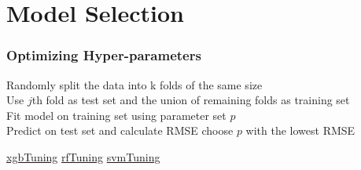 \documentclass{beamer}
\begin{document}
\section{Model Selection}



\begin{frame}[fragile]
\frametitle{Optimizing Hyper-parameters} 

\begin{algorithm}[H]
\scriptsize
\BlankLine
{}
    {
     Randomly split the data into k folds of the same size \\
    	{
    	Use $j$th fold as test set and the union of remaining folds as training set \\
        {
                Fit model on training set using parameter set $p$ \\
                Predict on test set and calculate RMSE 
        }
    	}%
        choose $p$ with the lowest RMSE
    }%
\caption{t-time k-fold crossvalidation and gridSearch}
\label{alg:seq}
\end{algorithm}


\quantnet \href{https://github.com/koehnden/SPL16/tree/master/Quantnet/xgbTuning/}{xgbTuning}
\quantnet \href{https://github.com/koehnden/SPL16/tree/master/Quantnet/rfTuning/}{rfTuning}
\quantnet \href{https://github.com/koehnden/SPL16/tree/master/Quantnet/svmTuning}{svmTuning}
\end{frame}
\end{document}
